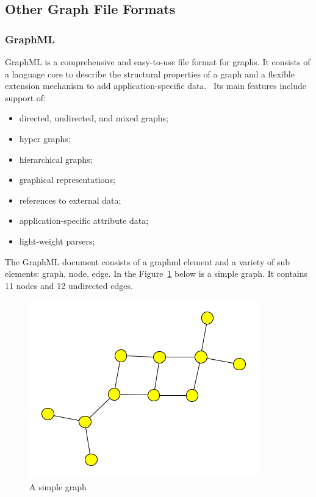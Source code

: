 \documentclass[a4paper,oneside]{article}
\begin{document}
\subsection{Other Graph File Formats}

\subsubsection{GraphML}
GraphML is a comprehensive and easy-to-use file format for graphs. It consists of a language core to describe the structural properties of a graph and a flexible extension mechanism to add application-specific data.~\cite{GraphML} Its main features include support of:
\begin{itemize}
\item directed, undirected, and mixed graphs;
\item hyper graphs;
\item hierarchical graphs;
\item graphical representations;
\item references to external data;
\item application-specific attribute data;
\item light-weight parsers;
\end{itemize}

The GraphML document consists of a graphml element and a variety of sub elements: graph, node, edge. In the Figure~\ref{simple_graphml} below is a simple graph. It contains 11 nodes and 12 undirected edges. 

\begin{center}
\begin{figure}
	\includegraphics[scale=1.0]{simple.png}
	\caption{A simple graph}
	\label{simple_graphml}
\end{figure}
\end{center}
\end{document}
